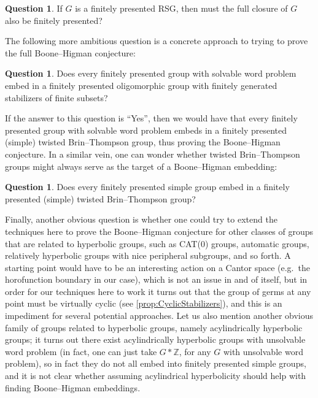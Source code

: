 \documentclass[11pt,letterpaper]{amsart}
\theoremstyle{definition}
\newtheorem{question}[theorem]{Question}
\newcommand{\Z}{\mathbb{Z}}
\begin{document}
\begin{question}
If $G$ is a finitely presented RSG, then must the full closure of $G$ also be finitely presented?
\end{question}

The following more ambitious question is a concrete approach to trying to prove the full Boone--Higman conjecture:

\begin{question}
Does every finitely presented group with solvable word problem embed in a finitely presented oligomorphic group with finitely generated stabilizers of finite subsets?
\end{question}

If the answer to this question is ``Yes'', then we would have that every finitely presented group with solvable word problem embeds in a finitely presented (simple) twisted Brin--Thompson group, thus proving the Boone--Higman conjecture. In a similar vein, one can wonder whether twisted Brin--Thompson groups might always serve as the target of a Boone--Higman embedding:

\begin{question}\label{quest:always_twisted_bt}
Does every finitely presented simple group embed in a finitely presented (simple) twisted Brin--Thompson group?
\end{question}

Finally, another obvious question is whether one could try to extend the techniques here to prove the Boone--Higman conjecture for other classes of groups that are related to hyperbolic groups, such as CAT(0) groups, automatic groups, relatively hyperbolic groups with nice peripheral subgroups, and so forth. A starting point would have to be an interesting action on a Cantor space (e.g.\ the horofunction boundary in our case), which is not an issue in and of itself, but in order for our techniques here to work it turns out that the group of germs at any point must be virtually cyclic (see \cref{prop:CyclicStabilizers}), and this is an impediment for several potential approaches. Let us also mention another obvious family of groups related to hyperbolic groups, namely acylindrically hyperbolic groups; it turns out there exist acylindrically hyperbolic groups with unsolvable word problem \cite[Theorem~7.7]{MinasyanOsin} (in fact, one can just take $G*\Z$, for any $G$ with unsolvable word problem), so in fact they do not all embed into finitely presented simple groups, and it is not clear whether assuming acylindrical hyperbolicity should help with finding Boone--Higman embeddings.
\end{document}
